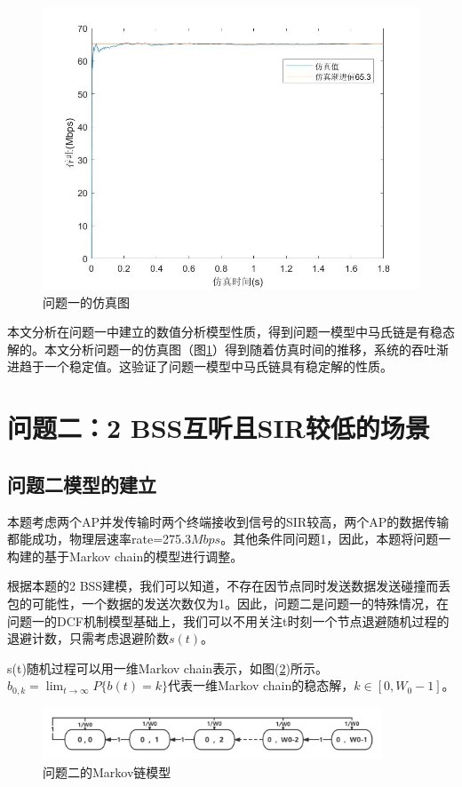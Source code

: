 \documentclass[bwprint]{gmcmthesis}
\begin{document}
\begin{figure}[H]
    \centering
    \includegraphics[width=.9\textwidth]{figures/q1.png}
    \caption{问题一的仿真图}
    \label{fig:q1}
\end{figure}

本文分析在问题一中建立的数值分析模型性质，得到问题一模型中马氏链是有稳态解的。本文分析问题一的仿真图（图\ref{fig:q1}）得到随着仿真时间的推移，系统的吞吐渐进趋于一个稳定值。这验证了问题一模型中马氏链具有稳定解的性质。

\section{问题二：2 BSS互听且SIR较低的场景}


\subsection{问题二模型的建立}
本题考虑两个AP并发传输时两个终端接收到信号的SIR较高，两个AP的数据传输都能成功，物理层速率rate=275.3$Mbps$。其他条件同问题1，因此，本题将问题一构建的基于Markov chain的模型进行调整。

根据本题的2 BSS建模，我们可以知道，不存在因节点同时发送数据发送碰撞而丢包的可能性，一个数据的发送次数仅为1。因此，问题二是问题一的特殊情况，在问题一的DCF机制模型基础上，我们可以不用关注t时刻一个节点退避随机过程的退避计数，只需考虑退避阶数$s(t)$\cite{cite2}。

s(t)随机过程可以用一维Markov chain表示，如图(\ref{fig:mar2})所示。 $b_{0,k}=\displaystyle \lim_{t \to \infty} P\{b(t)=k\}$代表一维Markov chain的稳态解，$k\in[0, W_0-1]$。

\begin{figure}[H]
\centering
\includegraphics[width=0.9\textwidth]{figures/mar2.png}
\caption{问题二的Markov链模型}
\label{fig:mar2}
\end{figure}
\end{document}
